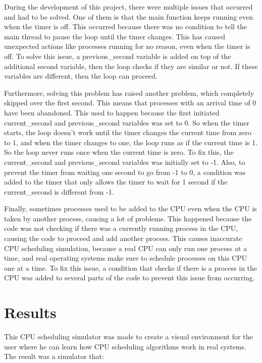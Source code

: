 \documentclass{article}
\begin{document}
During the development of this project, there were multiple issues that occurred and had to be solved. One of them is that the main function keeps running even when the timer is off. This occurred because there was no condition to tell the main thread to pause the loop until the timer changes. This has caused unexpected actions like processes running for no reason, even when the timer is off. To solve this issue, a previous\_second variable is added on top of the additional second variable, then the loop checks if they are similar or not. If these variables are different, then the loop can proceed. 

Furthermore, solving this problem has raised another problem, which completely skipped over the first second. This means that processes with an arrival time of 0 have been abandoned. This used to happen because the first initiated current\_second and previous\_second variables was set to 0. So when the timer starts, the loop doesn't work until the timer changes the current time from zero to 1, and when the timer changes to one, the loop runs as if the current time is 1. So the loop never runs once when the current time is zero. To fix this, the current\_second and previous\_second variables was initially set to -1. Also, to prevent the timer from waiting one second to go from -1 to 0, a condition was added to the timer that only allows the timer to wait for 1 second if the current\_second is different from -1.  

Finally, sometimes processes used to be added to the CPU even when the CPU is taken by another process, causing a lot of problems. This happened because the code was not checking if there was a currently running process in the CPU, causing the code to proceed and add another process. This causes inaccurate CPU scheduling simulation, because a real CPU can only run one process at a time, and real operating systems make sure to schedule processes on this CPU one at a time. To fix this issue, a condition that checks if there is a process in the CPU was added to several parts of the code to prevent this issue from occurring.

\section{Results}

This CPU scheduling simulator was made to create a visual environment for the user where he can learn how CPU scheduling algorithms work in real systems. The result was a simulator that:
\end{document}
